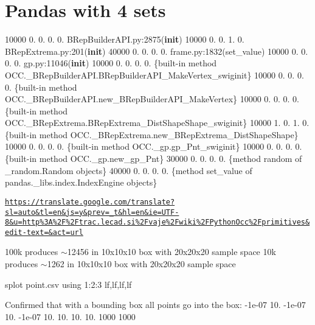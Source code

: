 \section*{Pandas with 4 sets }

10000 0. 0. 0. 0. B\+Rep\+Builder\+A\+P\+I.\+py\+:2875({\bfseries init}) 10000 0. 0. 1. 0. B\+Rep\+Extrema.\+py\+:201({\bfseries init}) 40000 0. 0. 0. 0. frame.\+py\+:1832(set\+\_\+value) 10000 0. 0. 0. 0. gp.\+py\+:11046({\bfseries init}) 10000 0. 0. 0. 0. \{built-\/in method O\+C\+C.\+\_\+\+B\+Rep\+Builder\+A\+P\+I.\+B\+Rep\+Builder\+A\+P\+I\+\_\+\+Make\+Vertex\+\_\+swiginit\} 10000 0. 0. 0. 0. \{built-\/in method O\+C\+C.\+\_\+\+B\+Rep\+Builder\+A\+P\+I.\+new\+\_\+\+B\+Rep\+Builder\+A\+P\+I\+\_\+\+Make\+Vertex\} 10000 0. 0. 0. 0. \{built-\/in method O\+C\+C.\+\_\+\+B\+Rep\+Extrema.\+B\+Rep\+Extrema\+\_\+\+Dist\+Shape\+Shape\+\_\+swiginit\} 10000 1. 0. 1. 0. \{built-\/in method O\+C\+C.\+\_\+\+B\+Rep\+Extrema.\+new\+\_\+\+B\+Rep\+Extrema\+\_\+\+Dist\+Shape\+Shape\} 10000 0. 0. 0. 0. \{built-\/in method O\+C\+C.\+\_\+gp.\+gp\+\_\+\+Pnt\+\_\+swiginit\} 10000 0. 0. 0. 0. \{built-\/in method O\+C\+C.\+\_\+gp.\+new\+\_\+gp\+\_\+\+Pnt\} 30000 0. 0. 0. 0. \{method \textquotesingle{}random\textquotesingle{} of \textquotesingle{}\+\_\+random.\+Random\textquotesingle{} objects\} 40000 0. 0. 0. 0. \{method \textquotesingle{}set\+\_\+value\textquotesingle{} of \textquotesingle{}pandas.\+\_\+libs.\+index.\+Index\+Engine\textquotesingle{} objects\}

\href{https://translate.google.com/translate?sl=auto&tl=en&js=y&prev=_t&hl=en&ie=UTF-8&u=http%3A%2F%2Ftrac.lecad.si%2Fvaje%2Fwiki%2FPythonOcc%2Fprimitives&edit-text=&act=url}{\tt https\+://translate.\+google.\+com/translate?sl=auto\&tl=en\&js=y\&prev=\+\_\+t\&hl=en\&ie=\+U\+T\+F-\/8\&u=http\%3\+A\%2\+F\%2\+Ftrac.\+lecad.\+si\%2\+Fvaje\%2\+Fwiki\%2\+F\+Python\+Occ\%2\+Fprimitives\&edit-\/text=\&act=url}

100k produces $\sim$12456 in 10x10x10 box with 20x20x20 sample space 10k produces $\sim$1262 in 10x10x10 box with 20x20x20 sample space

splot \textquotesingle{}point.\+csv\textquotesingle{} using 1\+:2\+:3 \textquotesingle{}lf,lf,lf,lf\textquotesingle{}

Confirmed that with a bounding box all points go into the box\+: -\/1e-\/07 10. -\/1e-\/07 10. -\/1e-\/07 10. 10. 10. 10. 1000 1000

